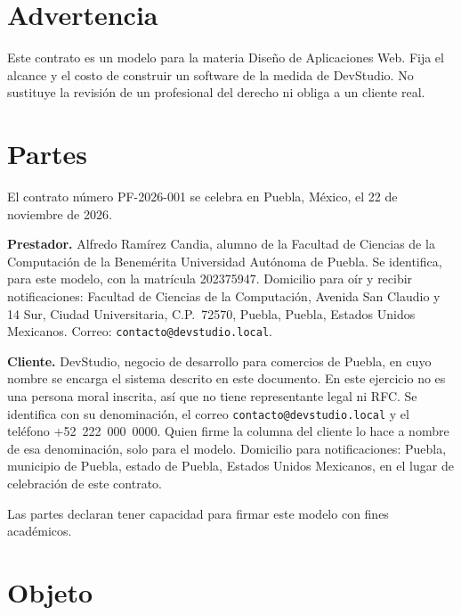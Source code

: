 



\tableofcontents
\clearpage

\section{Advertencia}

Este contrato es un modelo para la materia Diseño de Aplicaciones Web. Fija el
alcance y el costo de construir un software de la medida de DevStudio. No
sustituye la revisión de un profesional del derecho ni obliga a un cliente
real.

\section{Partes}

El contrato número PF-2026-001 se celebra en Puebla, México, el 22 de
noviembre de 2026.

\textbf{Prestador.} Alfredo Ramírez Candia, alumno de la Facultad de Ciencias
de la Computación de la Benemérita Universidad Autónoma de Puebla. Se
identifica, para este modelo, con la matrícula 202375947. Domicilio para oír
y recibir notificaciones: Facultad de Ciencias de la Computación, Avenida
San Claudio y 14 Sur, Ciudad Universitaria, C.P.~72570, Puebla, Puebla,
Estados Unidos Mexicanos. Correo: \texttt{contacto@devstudio.local}.

\textbf{Cliente.} DevStudio, negocio de desarrollo para comercios de Puebla,
en cuyo nombre se encarga el sistema descrito en este documento. En este
ejercicio no es una persona moral inscrita, así que no tiene representante
legal ni RFC. Se identifica con su denominación, el correo
\texttt{contacto@devstudio.local} y el teléfono +52~222~000~0000. Quien firme
la columna del cliente lo hace a nombre de esa denominación, solo para el
modelo. Domicilio para notificaciones: Puebla, municipio de Puebla, estado de
Puebla, Estados Unidos Mexicanos, en el lugar de celebración de este contrato.

Las partes declaran tener capacidad para firmar este modelo con fines
académicos.

\section{Objeto}

